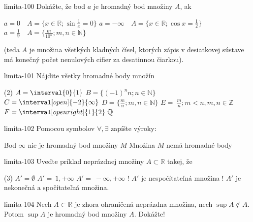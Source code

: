 \begin{defproblem}{limita-100}
Dokážte, že bod $a$ je hromadný bod množiny $A$, ak
\begin{tasks}
    \task $a=0 \quad A=\{x \in \mathbb{R}; \sin{\frac{1}{x}} = 0 \}$
    \task $a=-\infty \quad A=\{x \in \mathbb{R}; \cos{x} = \frac{1}{2} \}$
    \task $a=\frac{1}{9} \quad A=\{\frac{m}{10^n}; m,n \in \mathbb{N} \}$
\end{tasks}
(teda $A$ je množina všetkých kladných čísel, ktorých zápis v desiatkovej
sústave má konečný počet nenulových cifier za desatinnou čiarkou).
\end{defproblem}

\begin{defproblem}{limita-101}
Nájdite všetky hromadné body množín
\begin{tasks}(2)
\task $A= \interval{0}{1}$
\task $B= \{ (-1)^n n; n\in \mathbb{N} \} $
\task $C= \interval[open]{-2}{\infty}$
\task $D= \{\frac{m}{n}; m,n \in \mathbb{N} \}$
\task $E= {\ \frac{m}{n}; m<n,m,n \in \mathbb{Z}}$
\task $F= \interval[open right]{1}{2} \ \mathbb{Q}$
\end{tasks}
\end{defproblem}

\begin{defproblem}{limita-102}
Pomocou symbolov $\forall,\exists$ zapíšte výroky:
\begin{tasks}
\task Bod $\infty$ nie je hromadný bod množiny $M$
\task Množina $M$ nemá hromadné body
\end{tasks}
\end{defproblem}

\begin{defproblem}{limita-103}
Uveďte príklad neprázdnej množiny $A \subset \mathbb{R}$ takej, že
\begin{tasks}(3)
\task $A'=\emptyset$
\task $A'={\ 1, +\infty}$
\task $A'={\ -\infty,+\infty}$
\task! $A'$ je nespočítateľná množina
\task! $A'$ je nekonečná a spočítateľná množina.
\end{tasks}
\end{defproblem}

\begin{defproblem}{limita-104}
Nech $A \subset \mathbb{R}$ je zhora ohraničená neprázdna množina, nech $\sup A
\notin A$. Potom $\sup A$ je hromadný bod množiny $A$. Dokážte!
\end{defproblem}

